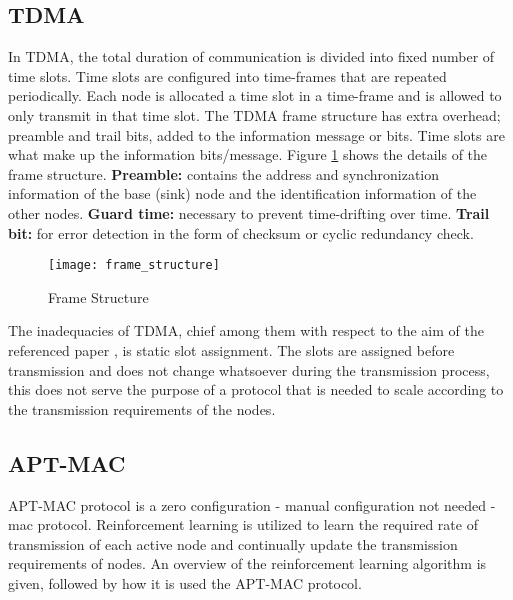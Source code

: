 \subsection{TDMA}
In TDMA, the total duration of communication is divided into fixed number of time slots.
Time slots are configured into time-frames that are repeated periodically.
Each node is allocated a time slot in a time-frame and is allowed to only transmit in that time slot.
The TDMA frame structure has extra overhead; preamble and trail bits, added to the information message or bits.
Time slots are what make up the information bits/message.
Figure \ref{fig:frame_structure} shows the details of the frame structure.\newline
\textbf{Preamble:} contains the address and synchronization information of the base (sink) node and the identification information of the other nodes.\newline
\textbf{Guard time:} necessary to prevent time-drifting over time.\newline
\textbf{Trail bit:} for error detection in the form of checksum or cyclic redundancy check.\newline
\begin{figure}[h]
    \centering
    \texttt{[image: frame\_structure]}
    \caption{Frame Structure}
    \label{fig:frame_structure}
\end{figure} \newline
The inadequacies of TDMA, chief among them with respect to the aim of the referenced paper \cite{Maselli}, is static slot assignment.
The slots are assigned before transmission and does not change whatsoever during the transmission process, this does not serve the purpose of a protocol that is needed to scale according to the transmission requirements of the nodes.

\subsection{APT-MAC}
APT-MAC protocol is a zero configuration - manual configuration not needed - mac protocol.
Reinforcement learning is utilized to learn the required rate of transmission of each active node and continually update the transmission requirements of nodes.
An overview of the reinforcement learning algorithm is given, followed by how it is used the APT-MAC protocol.
